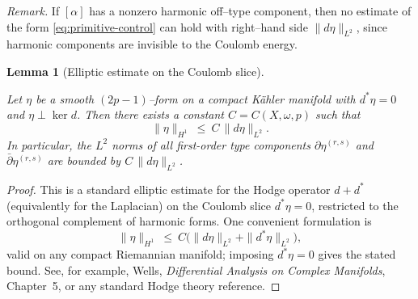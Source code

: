 \documentclass[11pt]{article}
\newcommand{\REV}[1]{\textcolor{blue}{#1}}
\newcommand{\REVMZ}[1]{\textcolor{teal}{#1}}  %
\numberwithin{equation}{section}  %
\theoremstyle{plain}
\newtheorem{lemma}[theorem]{Lemma}
\theoremstyle{definition}
\theoremstyle{remark}
\begin{document}
\smallskip
\noindent\emph{Remark.} If \([\alpha]\) has a nonzero harmonic off--type component, then no estimate of the form \eqref{eq:primitive-control} can hold with right--hand side \(\|d\eta\|_{L^2}\), since harmonic components are invisible to the Coulomb energy.



\begin{lemma}[Elliptic estimate on the Coulomb slice]\label{lem:elliptic-coulomb}

Let $\eta$ be a smooth $(2p-1)$--form on a compact K\"ahler manifold with $d^*\eta=0$ and $\eta\perp \ker d$.
Then there exists a constant $C=C(X,\omega,p)$ such that
\[
\|\eta\|_{H^1}\ \le\ C\,\|d\eta\|_{L^2}.
\]
In particular, the $L^2$ norms of all first-order type components $\partial\eta^{(r,s)}$ and $\bar\partial\eta^{(r,s)}$ are bounded by $C\,\|d\eta\|_{L^2}$.
\end{lemma}


\begin{proof}

This is a standard elliptic estimate for the Hodge operator $d+d^*$ \REVMZ{\cite{Wells,Voisin02}} (equivalently for the Laplacian) on the Coulomb slice $d^*\eta=0$, restricted to the orthogonal complement of harmonic forms.
One convenient formulation is
\[
\|\eta\|_{H^1}\ \le\ C\bigl(\|d\eta\|_{L^2}+\|d^*\eta\|_{L^2}\bigr),
\]
valid on any compact Riemannian manifold; imposing $d^*\eta=0$ gives the stated bound.
See, for example, Wells, \emph{Differential Analysis on Complex Manifolds}, Chapter~5, or any standard Hodge theory reference.
\end{proof}
\end{document}
